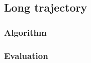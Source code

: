 \subsection{Long trajectory}
\label{sec:match:traj}

\subsubsection{Algorithm}

\subsubsection{Evaluation}
